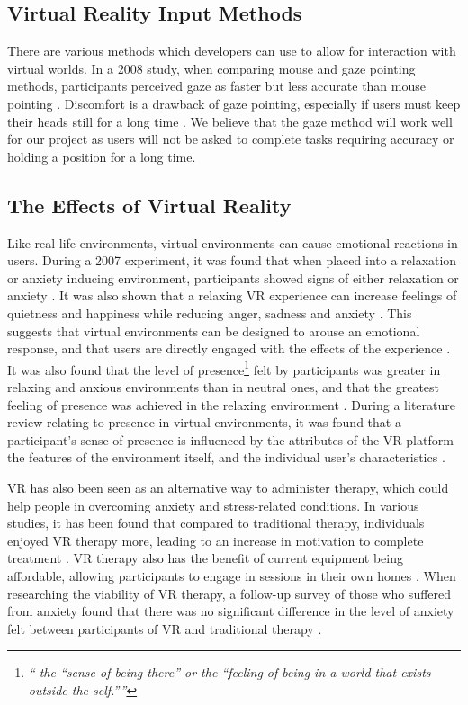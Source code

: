 \documentclass{sigchi}
\newcommand{\inlinequote}[1]{\textit{``#1''}}
\begin{document}
\subsection{Virtual Reality Input Methods}
There are various methods which developers can use to allow for interaction with virtual worlds. In a 2008 study, when comparing mouse and gaze pointing methods, participants perceived gaze as faster but less accurate than mouse pointing \cite{mateo2008gaze}. Discomfort is a drawback of gaze pointing, especially if users must keep their heads still for a long time \cite{mateo2008gaze}. We believe that the gaze method will work well for our project as users will not be asked to complete tasks requiring accuracy or holding a position for a long time.

\subsection{The Effects of Virtual Reality}
Like real life environments, virtual environments can cause emotional reactions in users. During a 2007 experiment, it was found that when placed into a relaxation or anxiety inducing environment, participants showed signs of either relaxation or anxiety \cite{riva2007affective}. It was also shown that a relaxing VR experience can increase feelings of quietness and happiness while reducing anger, sadness and anxiety \cite{riva2007affective}. This suggests that virtual environments can be designed to arouse an emotional response, and that users are directly engaged with the effects of the experience \cite{riva2007affective,wiederhold2006evaluation}. 
It was also found that the level of presence\footnote{\inlinequote{ the \inlinequote{sense of being there} or the \inlinequote{feeling of being in a world that exists outside the self.}}\cite{riva2007affective}} felt by participants was greater in relaxing and anxious environments than in neutral ones, and that the greatest feeling of presence was achieved in the relaxing environment \cite{riva2007affective}. During a literature review relating to presence in virtual environments, it was found that a participant's sense of presence is influenced by the attributes of the VR platform the features of the environment itself, and the individual user’s characteristics \cite{nash2000review}.

VR has also been seen as an alternative way to administer therapy, which could help people in overcoming anxiety and stress-related conditions. In various studies, it has been found that compared to traditional therapy, individuals enjoyed VR therapy more, leading to an increase in motivation to complete treatment \cite{kizony2003adapting,morel2015advantages}. VR therapy also has the benefit of current equipment being affordable, allowing participants to engage in sessions in their own homes \cite{morel2015advantages}. When researching the viability of VR therapy, a follow-up survey of those who suffered from anxiety found that there was no significant difference in the level of anxiety felt between participants of VR and traditional therapy \cite{safir2011virtual}.
\end{document}
